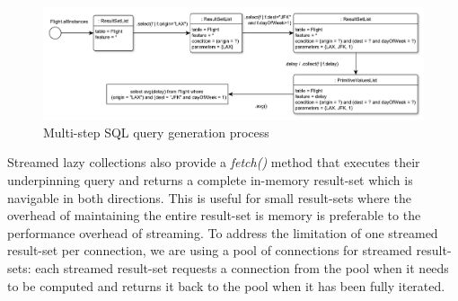 \begin{figure}
 \centering
		\includegraphics[width=\textwidth]{images/query.pdf}
	\caption{Multi-step SQL query generation process}
	\label{fig:query}
\end{figure}

Streamed lazy collections also provide a \emph{fetch()} method that executes their underpinning query and returns a complete in-memory result-set which is navigable in both directions. This is useful for small result-sets where the overhead of maintaining the entire result-set is memory is preferable to the performance overhead of streaming. To address the limitation of one streamed result-set per connection, we are using a pool of connections for streamed result-sets: each streamed result-set requests a connection from the pool when it needs to be computed and returns it back to the pool when it has been fully iterated.




